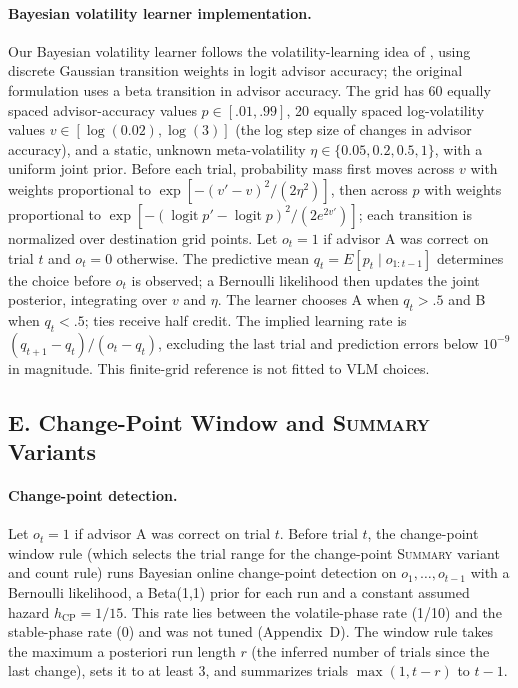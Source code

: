 \documentclass[letterpaper]{article} %
\newcommand{\Summary}{\textsc{Summary}}
\begin{document}
\paragraph{Bayesian volatility learner implementation.} Our Bayesian volatility learner follows the volatility-learning idea of \citet{behrens2007learning,behrens2008associative}, using discrete Gaussian transition weights in logit advisor accuracy; the original formulation uses a beta transition in advisor accuracy. The grid has 60 equally spaced advisor-accuracy values $p\in[.01,.99]$, 20 equally spaced log-volatility values $v\in[\log(0.02),\log(3)]$ (the log step size of changes in advisor accuracy), and a static, unknown meta-volatility $\eta\in\{0.05,0.2,0.5,1\}$, with a uniform joint prior. Before each trial, probability mass first moves across $v$ with weights proportional to $\exp[-(v'-v)^2/(2\eta^2)]$, then across $p$ with weights proportional to $\exp[-(\operatorname{logit}p'-\operatorname{logit}p)^2/(2e^{2v'})]$; each transition is normalized over destination grid points. Let $o_t=1$ if advisor A was correct on trial $t$ and $o_t=0$ otherwise. The predictive mean $q_t=E[p_t\mid o_{1:t-1}]$ determines the choice before $o_t$ is observed; a Bernoulli likelihood then updates the joint posterior, integrating over $v$ and $\eta$. The learner chooses A when $q_t>.5$ and B when $q_t<.5$; ties receive half credit. The implied learning rate is $(q_{t+1}-q_t)/(o_t-q_t)$, excluding the last trial and prediction errors below $10^{-9}$ in magnitude. This finite-grid reference is not fitted to VLM choices.

\subsection{E. Change-Point Window and \Summary{} Variants}
\paragraph{Change-point detection.} Let $o_t = 1$ if advisor A was correct on trial $t$. Before trial $t$, the change-point window rule (which selects the trial range for the change-point \Summary{} variant and count rule) runs Bayesian online change-point detection \citep{adams2007bocpd} on $o_1,\dots,o_{t-1}$ with a Bernoulli likelihood, a Beta(1,1) prior for each run and a constant assumed hazard $h_{\mathrm{CP}} = 1/15$. This rate lies between the volatile-phase rate (1/10) and the stable-phase rate (0) and was not tuned (Appendix~D). The window rule takes the maximum a posteriori run length $r$ (the inferred number of trials since the last change), sets it to at least 3, and summarizes trials $\max(1, t-r)$ to $t-1$.
\end{document}
